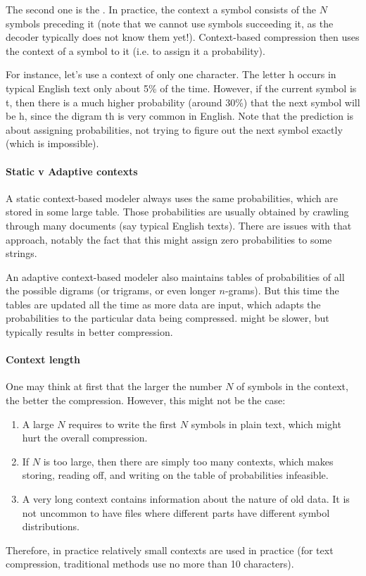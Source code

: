 \documentclass[a4paper, 11pt, openany]{book}
\begin{document}
The second one is the . In practice, the context a symbol consists of the $N$ symbols preceding it (note that we cannot use symbols succeeding it, as the decoder typically does not know them yet!). Context-based compression then uses the context of a symbol to  it (i.e. to assign it a probability).

For instance, let's use a context of only one character. The letter h occurs in typical English text only about 5\% of the time. However, if the current symbol is t, then there is a much higher probability (around 30\%) that the next symbol will be h, since the digram th is very common in English. Note that the prediction is about assigning probabilities, not trying to figure out the next symbol exactly (which is impossible).

\paragraph{Static v Adaptive contexts} A static context-based modeler always uses the same probabilities, which are stored in some large table. Those probabilities are usually obtained by crawling through many documents (say typical English texts). There are issues with that approach, notably the fact that this might assign zero probabilities to some strings.

An adaptive context-based modeler also maintains tables of probabilities of all the possible digrams (or trigrams, or even longer $n$-grams). But this time the tables are updated all the time as more data are input, which adapts the probabilities to the particular data being compressed.  might be slower, but typically results in better compression.



\paragraph{Context length} One may think at first that the larger the number $N$ of symbols in the context, the better the compression. However, this might not be the case:
\begin{enumerate}
    \item A large $N$ requires to write the first $N$ symbols in plain text, which might hurt the overall compression.

    \item If $N$ is too large, then there are simply too many contexts, which makes storing, reading off, and writing on the table of probabilities infeasible.

    \item A very long context contains information about the nature of old data. It is not uncommon to have files where different parts have different symbol distributions.
\end{enumerate}
Therefore, in practice relatively small contexts are used in practice (for text compression, traditional methods use no more than 10 characters).
\end{document}
